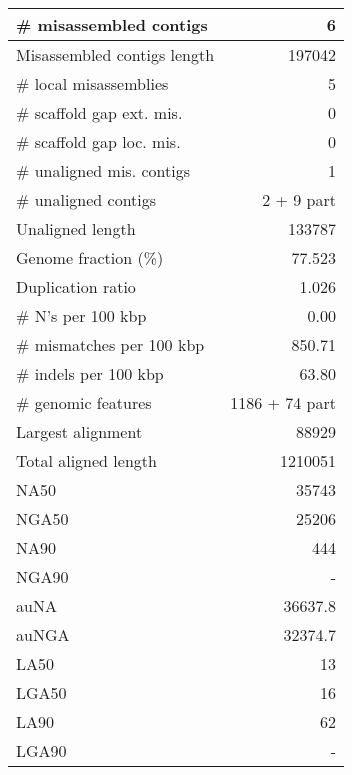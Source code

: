 \documentclass[12pt,a4paper]{article}
\begin{document}
\begin{table}[ht]
\begin{center}
\begin{tabular}{|l*{1}{|r}|}
\# misassembled contigs & 6 \\ \hline
Misassembled contigs length & 197042 \\ \hline
\# local misassemblies & 5 \\ \hline
\# scaffold gap ext. mis. & 0 \\ \hline
\# scaffold gap loc. mis. & 0 \\ \hline
\# unaligned mis. contigs & 1 \\ \hline
\# unaligned contigs & 2 + 9 part \\ \hline
Unaligned length & 133787 \\ \hline
Genome fraction (\%) & 77.523 \\ \hline
Duplication ratio & 1.026 \\ \hline
\# N's per 100 kbp & 0.00 \\ \hline
\# mismatches per 100 kbp & 850.71 \\ \hline
\# indels per 100 kbp & 63.80 \\ \hline
\# genomic features & 1186 + 74 part \\ \hline
Largest alignment & 88929 \\ \hline
Total aligned length & 1210051 \\ \hline
NA50 & 35743 \\ \hline
NGA50 & 25206 \\ \hline
NA90 & 444 \\ \hline
NGA90 & - \\ \hline
auNA & 36637.8 \\ \hline
auNGA & 32374.7 \\ \hline
LA50 & 13 \\ \hline
LGA50 & 16 \\ \hline
LA90 & 62 \\ \hline
LGA90 & - \\ \hline
\end{tabular}
\end{center}
\end{table}
\end{document}
